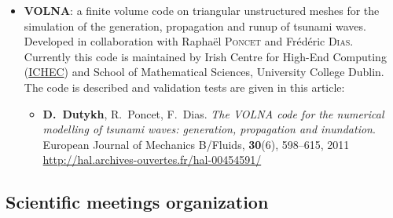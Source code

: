 \documentclass[final, a4paper, oneside, 12pt]{article}
\numberwithin{equation}{section}
\begin{document}
\begin{itemize}

  \item \textbf{VOLNA}: a finite volume code on triangular unstructured meshes for the simulation of the generation, propagation and runup of tsunami waves. Developed in collaboration with Rapha\"el \textsc{Poncet} and Fr\'ed\'eric \textsc{Dias}. Currently this code is maintained by Irish Centre for High-End Computing (\href{http://www.ichec.ie/}{ICHEC}) and School of Mathematical Sciences, University College Dublin. The code is described and validation tests are given in this article:
  \begin{itemize}
    \item \textbf{D.~Dutykh}, R.~Poncet, F.~Dias. \textit{The VOLNA code for the numerical modelling of tsunami waves: generation, propagation and inundation}. European Journal of Mechanics B/Fluids, \textbf{30}(6), 598--615, 2011 \\
  \url{http://hal.archives-ouvertes.fr/hal-00454591/}
  \end{itemize}
  
\end{itemize}

\subsection{Scientific meetings organization}
\end{document}

